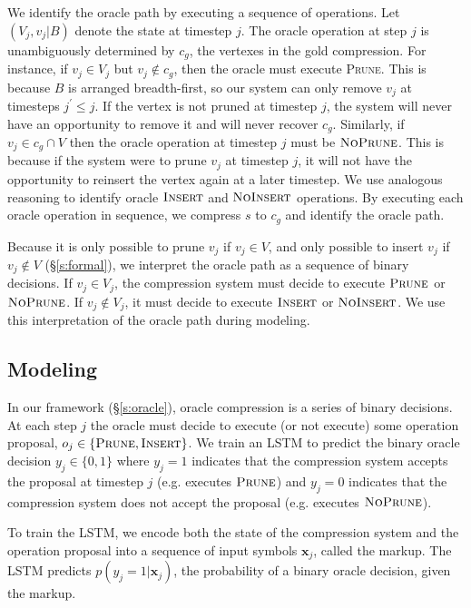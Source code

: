 \documentclass[11pt,a4paper]{article}
\begin{document}
We identify the oracle path by executing  a sequence of operations. Let $(V_j, v_j | B)$ denote the state at timestep $j$. The oracle operation at step $j$ is unambiguously determined by $c_g$, the vertexes in the gold compression. For instance, if $v_j \in V_j$ but $v_j \notin c_g$, then the oracle must execute \textsc{Prune}. This is because $B$ is arranged breadth-first, so our system can only remove $v_j$ at timesteps $j^{\prime} \leq j$. If the vertex is not pruned at timestep $j$, the system will never have an opportunity to remove it and will never recover $c_g$. Similarly, if $v_j \in c_g \cap V$ then the oracle operation at timestep $j$ must be $\textsc{NoPrune}$. This is because if the system were to prune $v_j$ at timestep $j$, it will not have the opportunity to reinsert the vertex again at a later timestep. We use analogous reasoning to identify oracle $\textsc{Insert}$ and $\textsc{NoInsert}$ operations. By executing each oracle operation in sequence, we compress $s$ to $c_g$ and identify the oracle path.

Because it is only possible to prune $v_j$ if $v_j \in V$, and only possible to insert $v_j$ if $v_j \notin V$ (\S\ref{s:formal}), we interpret the oracle path as a sequence of binary decisions. If $v_j \in V_j$, the compression system must decide to execute $\textsc{Prune}$ or $\textsc{NoPrune}$. If $v_j \notin V_j$, it must decide to execute $\textsc{Insert}$ or $\textsc{NoInsert}$. We use this interpretation of the oracle path during modeling.

\subsection{Modeling}\label{s:modeling}

In our framework (\S\ref{s:oracle}), oracle compression is a series of binary decisions. At each step $j$ the oracle must decide to execute (or not execute) some operation proposal, $o_j \in \{\textsc{Prune}, \textsc{Insert}\}$. We train an LSTM \cite{Hochreiter1997LongSM} to predict the binary oracle decision $y_j \in \{0,1\}$ where $y_j=1$ indicates that the compression system accepts the proposal at timestep $j$ (e.g. executes $\textsc{Prune}$) and $y_j=0$ indicates that the compression system does not accept the proposal (e.g. executes $\textsc{NoPrune}$).

To train the LSTM, we encode both the state of the compression system and the operation proposal into a sequence of input symbols $\bm{x}_j$, called the markup. The LSTM predicts $p(y_j=1 | \bm{x}_j)$, the probability of a binary oracle decision, given the markup. 
\end{document}
